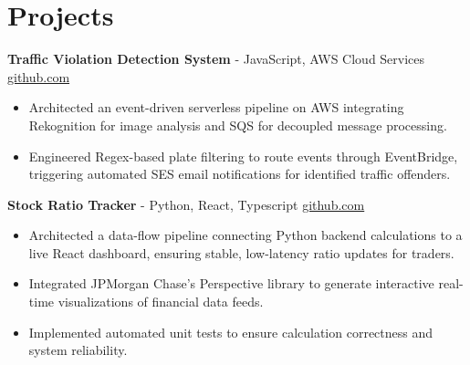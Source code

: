 \documentclass[11pt]{article}       %
\begin{document}
\vspace{-18.5pt}

\section*{Projects}

\textbf{Traffic Violation Detection System}{ - JavaScript, AWS Cloud Services} \hfill \href{https://github.com/Monica20030707/AWS_rekonigition-N-read-database}{github.com} \\
\vspace{-9pt}
\begin{itemize}
  \item Architected an event-driven serverless pipeline on AWS integrating Rekognition for image analysis and SQS for decoupled message processing.
  \item Engineered Regex-based plate filtering to route events through EventBridge, triggering automated SES email notifications for identified traffic offenders.
\end{itemize}

\textbf{Stock Ratio Tracker}{ - Python, React, Typescript} \hfill \href{https://github.com/Monica20030707/Trading-Dashboard_UI}{github.com} \\
\vspace{-9pt}
\begin{itemize}
  \item Architected a data-flow pipeline connecting Python backend calculations to a live React dashboard, ensuring stable, low-latency ratio updates for traders.
  \item Integrated JPMorgan Chase's Perspective library to generate interactive real-time visualizations of financial data feeds.
  \item Implemented automated unit tests to ensure calculation correctness and system reliability.
\end{itemize}

\end{document}
